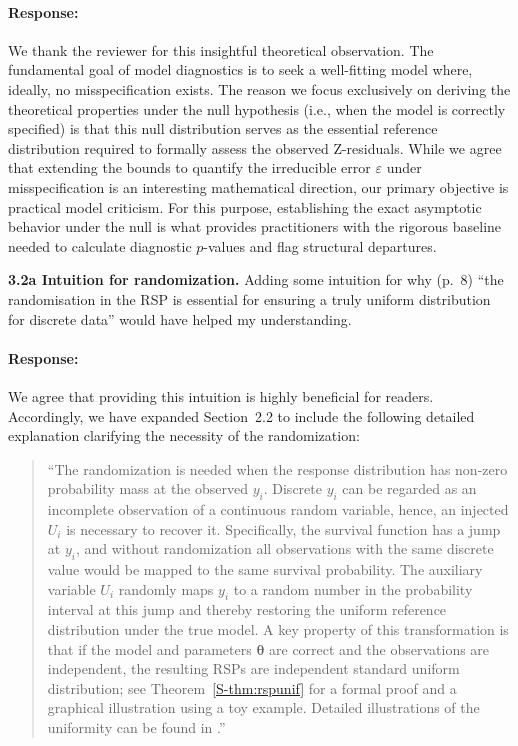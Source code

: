 \documentclass[11pt]{article}
\newcommand*{\mybox}[2]{%
  \par\medskip\noindent
  \colorbox{#1!30}{\parbox{.98\linewidth}{#2}}%
  \par\medskip
}
\begin{document}
\paragraph{Response:}
We thank the reviewer for this insightful theoretical observation. The fundamental goal of model diagnostics is to seek a well-fitting model where, ideally, no misspecification exists. The reason we focus exclusively on deriving the theoretical properties under the null hypothesis (i.e., when the model is correctly specified) is that this null distribution serves as the essential reference distribution required to formally assess the observed Z-residuals. While we agree that extending the bounds to quantify the irreducible error $\varepsilon$ under misspecification is an interesting mathematical direction, our primary objective is practical model criticism. For this purpose, establishing the exact asymptotic behavior under the null is what provides practitioners with the rigorous baseline needed to calculate diagnostic $p$-values and flag structural departures.



\mybox{gray}{\textbf{3.2a Intuition for randomization.} Adding some intuition for why (p.~8) ``the randomisation in the RSP is essential for ensuring a truly uniform distribution for discrete data'' would have helped my understanding.}

\paragraph{Response:}
We agree that providing this intuition is highly beneficial for readers. Accordingly, we have expanded Section~2.2 to include the following detailed explanation clarifying the necessity of the randomization:

\begin{quote}
``The randomization is needed when the response distribution has non-zero probability mass at the observed $y_i$. Discrete $y_i$ can be regarded as an incomplete observation of a continuous random variable, hence, an injected $U_i$ is necessary to recover it. Specifically, the survival function has a jump at \(y_i\), and without randomization all observations with the same discrete value would be mapped to the same survival probability. The auxiliary variable \(U_i\) randomly maps $y_i$ to a random number in the probability interval at this jump and thereby restoring the uniform reference distribution under the true model. A key property of this transformation is that if the model and parameters $\bm{\theta}$ are correct and the observations are independent, the resulting RSPs are independent standard uniform distribution; see Theorem~\ref{S-thm:rspunif} for a formal proof and a graphical illustration using a toy example. Detailed illustrations of the uniformity can be found in \citet{Dunn1996, FengCindy2020Acor}.''
\end{quote}
\end{document}

